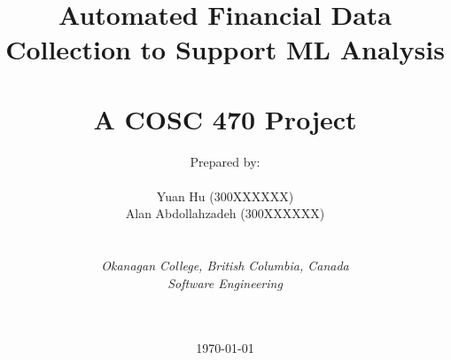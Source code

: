 
\def\Company{}
\def\Institute{\textit{Okanagan College, British Columbia, Canada}}
\def\Course{\textit{Software Engineering}}
\def\Module{\textit{ }}
\def\Docent{\textit{}}
\def\Assistant{\textit{}}

\def\BoldTitle{Automated Financial Data Collection to Support ML Analysis\\}

\def\Subtitle{A COSC 470 Project\\}
\def\Authors{Prepared by:\\\\ Yuan Hu (300XXXXXX) \\ Alan Abdollahzadeh (300XXXXXX) } 
\def\Shortname{}


\title{\textbf{\BoldTitle}\\\Subtitle}
\author{\Authors \\ \\ \\ \Institute\\ \Course\\ \Module\\ \Docent\\ \Assistant}
\date{\today}

